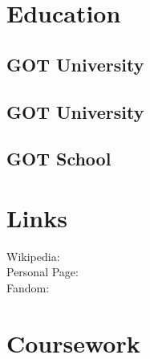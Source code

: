 \documentclass[]{ds-resume}
\begin{document}
\begin{minipage}[t]{0.33\textwidth} 


\section{Education} 

\subsection{GOT University}
\sectionsep

\subsection{GOT University}
\sectionsep

\subsection{GOT School}
\sectionsep



\section{Links} 

Wikipedia:  \href{https://en.wikipedia.org/wiki/Arya_Stark}{} \\
Personal Page:  \href{https://en.wikipedia.org/wiki/Maisie_Williams/}{} \\
Fandom:  \href{https://gameofthrones.fandom.com/wiki/Arya_Stark}{} \\


\sectionsep


\section{Coursework}


\end{minipage}
\end{document}
